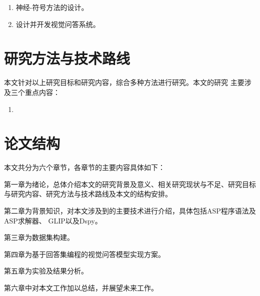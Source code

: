 \begin{enumerate}[label=(\arabic*),itemsep=0pt,parsep=0pt]
    \item 神经-符号方法的设计。
    \item 设计并开发视觉问答系统。
\end{enumerate}

\section{研究方法与技术路线}
本文针对以上研究目标和研究内容，综合多种方法进行研究。本文的研究
主要涉及三个重点内容：
\begin{enumerate}[label=(\arabic*),itemsep=0pt,parsep=0pt]
    \item 
\end{enumerate}

\section{论文结构}
本文共分为六个章节，各章节的主要内容具体如下：

第一章为绪论，总体介绍本文的研究背景及意义、相关研究现状与不足、研究目标
与研究内容、研究方法与技术路线及本文的结构安排。

第二章为背景知识，对本文涉及到的主要技术进行介绍，具体包括ASP程序语法及ASP求解器、
GLIP以及Dspy。

第三章为数据集构建。

第四章为基于回答集编程的视觉问答模型实现方案。

第五章为实验及结果分析。

第六章中对本文工作加以总结，并展望未来工作。
